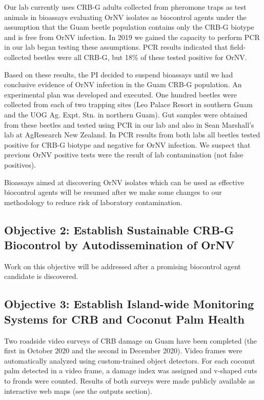 \documentclass[12pt,letterpaper,english,bibliography=totocnumbered,abstract=on]{scrartcl}
\begin{document}
Our lab currently uses CRB-G adults collected from pheromone traps as test animals in bioassays evaluating OrNV isolates as biocontrol agents under the assumption that the Guam beetle population contains only the CRB-G biotype and is free from OrNV infection. In 2019 we gained the capacity to perform PCR in our lab began testing these assumptions. PCR results indicated that field-collected beetles were all CRB-G, but 18\% of these tested positive for OrNV.

Based on these results, the PI decided to suspend bioassays until we had conclusive evidence of OrNV infection in the Guam CRB-G population.  An experimental plan was developed and executed. One hundred beetles were collected from each of two trapping sites (Leo Palace Resort in southern Guam and the UOG Ag. Expt. Stn. in northern Guam). Gut samples were obtained from these beetles and tested using PCR in our lab and also in Sean Marshall's lab at AgResearch New Zealand. In PCR results from both labs all beetles tested positive for CRB-G biotype and negative for OrNV infection. We suspect that previous OrNV positive tests were the result of lab contamination (not false positives). 

Bioassays aimed at discovering OrNV isolates which can be used as effective biocontrol agents will be resumed after we make some changes to our methodology to reduce risk of laboratory contamination. 

\subsection{Objective 2: Establish Sustainable CRB-G Biocontrol by Autodissemination of OrNV}

Work on this objective will be addressed after a promising biocontrol agent candidate is discovered.

\subsection{Objective 3: Establish Island-wide Monitoring Systems for CRB and Coconut Palm Health}

Two roadside video surveys of CRB damage on Guam have been completed (the first in October 2020 and the second in December 2020).  Video frames were automatically analyzed using custom-trained object detectors. For each coconut palm detected in a video frame, a damage index was assigned and v-shaped cuts to fronds were counted. Results of both surveys were made  publicly available as interactive web maps (see the outputs section).
\end{document}
